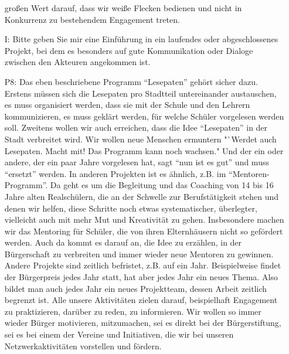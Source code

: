 \begin{itemize}
gro{\ss}en Wert darauf, dass wir wei{\ss}e Flecken bedienen und nicht in Konkurrenz zu bestehendem Engagement treten.
    \item[I:] Bitte geben Sie mir eine Einf{\"u}hrung in ein laufendes oder abgeschlossenes Projekt, bei dem es besonders auf gute Kommunikation oder Dialoge zwischen den Akteuren angekommen ist.
    \item[P8:] Das eben beschriebene Programm "`Lesepaten"' geh{\"o}rt sicher dazu. Erstens m{\"u}ssen sich die Lesepaten pro Stadtteil untereinander austauschen, es muss organisiert werden, dass sie mit der Schule und den Lehrern kommunizieren, es muss gekl{\"a}rt werden, f{\"u}r welche Sch{\"u}ler vorgelesen werden soll. Zweitens wollen wir auch erreichen, dass die Idee "`Lesepaten"' in der Stadt verbreitet wird. Wir wollen neue Menschen ermuntern "`Werdet auch Lesepaten. Macht mit! Das Programm kann noch wachsen." Und der ein oder andere, der ein paar Jahre vorgelesen hat, sagt "`nun ist es gut"' und muss "`ersetzt"' werden. In  anderen Projekten ist es {\"a}hnlich, z.B. im "`Mentoren-Programm"'. Da geht es um die Begleitung und das Coaching von 14 bis 16 Jahre alten Realsch{\"u}lern, die an der Schwelle zur Berufst{\"a}tigkeit stehen und denen wir helfen, diese Schritte noch etwas systematischer, {\"u}berlegter, vielleicht auch mit mehr Mut und Kreativit{\"a}t zu gehen. Insbesondere machen wir das Mentoring f{\"u}r Sch{\"u}ler, die von ihren Elternh{\"a}usern nicht so gef{\"o}rdert werden. Auch da kommt es darauf an, die Idee zu erz{\"a}hlen, in der B{\"u}rgerschaft zu verbreiten und immer wieder neue Mentoren zu gewinnen. Andere Projekte sind zeitlich befristet, z.B. auf ein Jahr. Beispielweise findet der B{\"u}rgerpreis jedes Jahr statt, hat aber jedes Jahr ein neues Thema. Also bildet man auch jedes Jahr ein neues Projektteam, dessen Arbeit zeitlich begrenzt ist. Alle unsere Aktivit{\"a}ten zielen darauf, beispielhaft Engagement zu praktizieren, dar{\"u}ber zu reden, zu informieren. Wir wollen so immer wieder B{\"u}rger motivieren, mitzumachen, sei es direkt bei der B{\"u}rgerstiftung, sei es bei einem der Vereine und Initiativen, die wir bei unseren Netzwerkaktivit{\"a}ten vorstellen und f{\"o}rdern.
\end{itemize}

